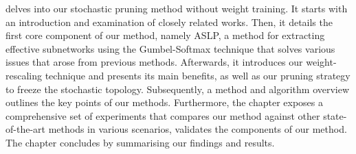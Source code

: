  delves into our stochastic pruning method without weight
training. It starts with an introduction and examination of closely related
works. Then, it details the first core component of our method, namely
\acl{ASLP}, a method for extracting effective subnetworks using the
Gumbel-Softmax technique that solves various issues that arose from previous
methods. Afterwards, it introduces our weight-rescaling technique and presents
its main benefits, as well as our pruning strategy to freeze the stochastic
topology. Subsequently, a method and algorithm overview outlines the key points
of our methods. Furthermore, the chapter exposes a comprehensive set of
experiments that compares our method against other state-of-the-art methods in
various scenarios, validates the components of our method. The chapter concludes
by summarising our findings and results.\\